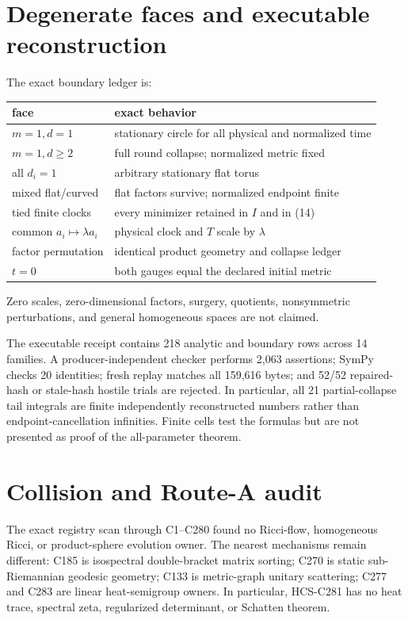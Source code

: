 \documentclass[10pt]{article}
\begin{document}
\section{Degenerate faces and executable reconstruction}
The exact boundary ledger is:
\begin{center}
\begin{tabular}{@{}ll@{}}
\toprule
face & exact behavior\\ \midrule
$m=1,d=1$ & stationary circle for all physical and normalized time\\
$m=1,d\geq2$ & full round collapse; normalized metric fixed\\
all $d_i=1$ & arbitrary stationary flat torus\\
mixed flat/curved & flat factors survive; normalized endpoint finite\\
tied finite clocks & every minimizer retained in $I$ and in (14)\\
common $a_i\mapsto\lambda a_i$ & physical clock and $T$ scale by $\lambda$\\
factor permutation & identical product geometry and collapse ledger\\
$t=0$ & both gauges equal the declared initial metric\\ \bottomrule
\end{tabular}
\end{center}
Zero scales, zero-dimensional factors, surgery, quotients, nonsymmetric
perturbations, and general homogeneous spaces are not claimed.

The executable receipt contains 218 analytic and boundary rows across 14
families.  A producer-independent checker performs 2,063 assertions; SymPy
checks 20 identities; fresh replay matches all 159,616 bytes; and 52/52
repaired-hash or stale-hash hostile trials are rejected.  In particular, all
21 partial-collapse tail integrals are finite independently reconstructed
numbers rather than endpoint-cancellation infinities.  Finite cells test
the formulas but are not presented as proof of the all-parameter theorem.

\section{Collision and Route-A audit}
The exact registry scan through C1--C280 found no Ricci-flow, homogeneous
Ricci, or product-sphere evolution owner.  The nearest mechanisms remain
different: C185 is isospectral double-bracket matrix sorting; C270 is static
sub-Riemannian geodesic geometry; C133 is metric-graph unitary scattering;
C277 and C283 are linear heat-semigroup owners.  In particular, HCS-C281 has
no heat trace, spectral zeta, regularized determinant, or Schatten theorem.
\end{document}
